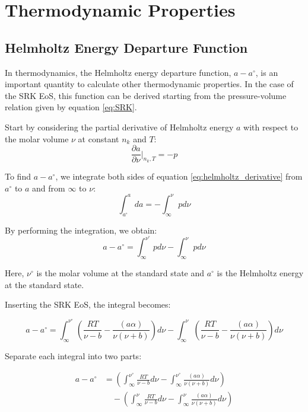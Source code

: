\documentclass{article}
\newcommand{\pderiv}[2]{\frac{\partial #1}{\partial #2}}
\begin{document}
\section{Thermodynamic Properties}
\subsection{Helmholtz Energy Departure Function}
In thermodynamics, the Helmholtz energy departure function, \( a - a^\circ \), is an important quantity to calculate other thermodynamic properties. In the case of the SRK EoS, this function can be derived starting from the pressure-volume relation given by equation \eqref{eq:SRK}.


Start by considering the partial derivative of Helmholtz energy \( a \) with respect to the molar volume \( \nu \) at constant \( n_k \) and \( T \):
\begin{equation}
    \pderiv{a}{\nu}\biggr\rvert_{n_k,T} = -p \label{eq:helmholtz_derivative}
\end{equation}

To find \( a - a^\circ \), we integrate both sides of equation \eqref{eq:helmholtz_derivative} from \( a^\circ \) to \( a \) and from \( \infty \) to \( \nu \):
\begin{equation}
    \int_{a^\circ}^a da = -\int_{\infty}^{\nu} p d\nu \label{eq:integration}
\end{equation}

By performing the integration, we obtain:
\begin{equation}
    a - a^\circ = \int_{\infty}^{\nu^\circ}pd\nu - \int_{\infty}^{\nu}pd\nu \label{eq:integration_result}
\end{equation}

Here, \( \nu^\circ \) is the molar volume at the standard state and \( a^\circ \) is the Helmholtz energy at the standard state. 


Inserting the SRK EoS, the integral becomes:

\begin{equation}
a - a^\circ = \int_{\infty}^{\nu^\circ} \left(\frac{RT}{\nu-b} - \frac{(a\alpha)}{\nu(\nu+b)}\right) d\nu - \int_{\infty}^{\nu} \left(\frac{RT}{\nu-b} - \frac{(a\alpha)}{\nu(\nu+b)}\right) d\nu
\end{equation}


Separate each integral into two parts:

\begin{align}
a - a^\circ &= \left(\int_{\infty}^{\nu^\circ} \frac{RT}{\nu-b} d\nu - \int_{\infty}^{\nu^\circ} \frac{(a\alpha)}{\nu(\nu+b)} d\nu\right) \nonumber \\
&\quad - \left(\int_{\infty}^{\nu} \frac{RT}{\nu-b} d\nu - \int_{\infty}^{\nu} \frac{(a\alpha)}{\nu(\nu+b)} d\nu\right)
\end{align}
\end{document}
